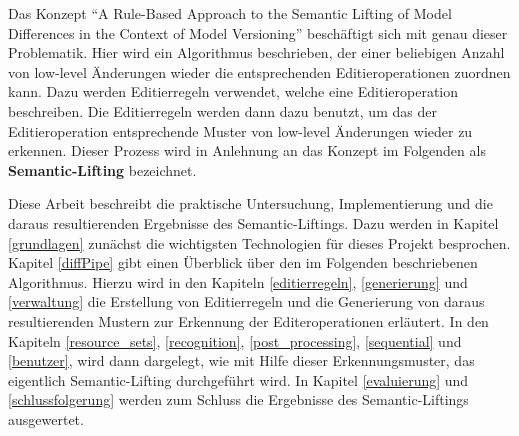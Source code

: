 Das Konzept "`A Rule-Based Approach to the Semantic Lifting of Model Differences in the Context of
Model Versioning"' \cite{KeKT2011ASE} beschäftigt sich mit genau dieser Problematik. Hier wird ein
Algorithmus beschrieben, der einer beliebigen Anzahl von low-level Änderungen wieder die
entsprechenden Editieroperationen zuordnen kann. Dazu werden Editierregeln verwendet, welche eine
Editieroperation beschreiben. Die Editierregeln werden dann dazu benutzt, um das der Editieroperation
entsprechende Muster von low-level Änderungen wieder zu erkennen.  Dieser Prozess wird in Anlehnung
an das Konzept im Folgenden als \textbf{Semantic-Lifting} bezeichnet. 

Diese Arbeit beschreibt die praktische Untersuchung, Implementierung und die daraus resultierenden
Ergebnisse des Semantic-Liftings. Dazu werden in Kapitel \ref{grundlagen} zunächst die wichtigsten
Technologien für dieses Projekt besprochen. Kapitel \ref{diffPipe} gibt einen Überblick über
den im Folgenden beschriebenen Algorithmus. Hierzu wird in den Kapiteln \ref{editierregeln},
\ref{generierung} und \ref{verwaltung} die Erstellung von Editierregeln und die Generierung von
daraus resultierenden Mustern zur Erkennung der Editeroperationen erläutert. In den Kapiteln
\ref{resource_sets}, \ref{recognition}, \ref{post_processing}, \ref{sequential} und
\ref{benutzer}, wird dann dargelegt, wie mit Hilfe dieser Erkennungsmuster, das eigentlich
Semantic-Lifting durchgeführt wird. In Kapitel \ref{evaluierung} und \ref{schlussfolgerung} werden
zum Schluss die Ergebnisse des Semantic-Liftings ausgewertet.
